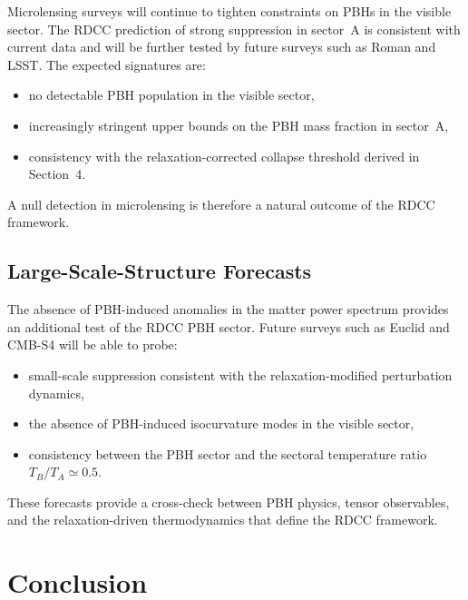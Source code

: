 \documentclass[11pt,a4paper]{article}
\begin{document}
Microlensing surveys will continue to tighten constraints on PBHs in the visible sector. The
RDCC prediction of strong suppression in sector~A is consistent with current data and will be
further tested by future surveys such as Roman and LSST. The expected signatures are:

\begin{itemize}
\item no detectable PBH population in the visible sector,
\item increasingly stringent upper bounds on the PBH mass fraction in sector~A,
\item consistency with the relaxation-corrected collapse threshold derived in Section~4.
\end{itemize}

A null detection in microlensing is therefore a natural outcome of the RDCC framework.


\subsection{Large-Scale-Structure Forecasts}

The absence of PBH-induced anomalies in the matter power spectrum provides an additional
test of the RDCC PBH sector. Future surveys such as Euclid and CMB-S4 will be able to probe:

\begin{itemize}
\item small-scale suppression consistent with the relaxation-modified perturbation dynamics,
\item the absence of PBH-induced isocurvature modes in the visible sector,
\item consistency between the PBH sector and the sectoral temperature ratio \(T_{B}/T_{A} \simeq 0.5\).
\end{itemize}

These forecasts provide a cross-check between PBH physics, tensor observables, and the
relaxation-driven thermodynamics that define the RDCC framework.


\section{Conclusion}
\end{document}
